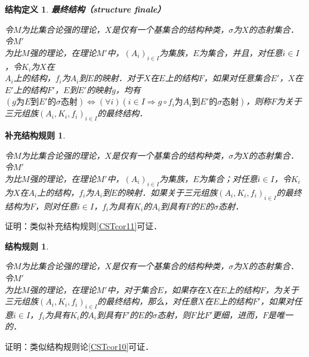 \documentclass[12pt, a4paper, oneside]{book}
\newtheorem{STdef}{结构定义}
\newtheorem{CST}{结构规则}
\newtheorem{CSTcor}{补充结构规则}
\begin{document}
			\begin{STdef}
				\textbf{最终结构（structure finale）}
				\par
				令$M$为比集合论强的理论，$X$是仅有一个基集合的结构种类，$\sigma$为$X$的态射集合．令$M'$\\为比$M$强的理论，在理论$M'$中，$(A_i)_{i\in I}$为集族，$E$为集合，并且，对任意$i\in I$，令$K_i$为$X$在\\$A_i$上的结构，$f_i$为$A_i$到$E$的映射．对于$X$在$E$上的结构$F$，如果对任意集合$E'$，$X$在$E'$上的结构$F'$，$E$到$E'$的映射$g$，均有$(g\text{为}E\text{到}E'\text{的}\sigma\text{态射})\Leftrightarrow (\forall i)(i\in I\Rightarrow g\circ f_i\text{为}A_i\text{到}E'\text{的}\sigma\text{态射})$，则称$F$为关于三元组族$(A_i, K_i, f_i)_{i\in I}$的最终结构．
			\end{STdef}
			
			\begin{CSTcor}\label{CSTcor12}
				\hfill\par
				令$M$为比集合论强的理论，$X$是仅有一个基集合的结构种类，$\sigma$为$X$的态射集合．令$M'$\\为比$M$强的理论，在理论$M'$中，$(A_i)_{i\in I}$为集族，$E$为集合；对任意$i\in I$，令$K_i$为$X$在$A_i$上的结构，$f_i$为$A_i$到$E$的映射．如果关于三元组族$(A_i, K_i, f_i)_{i\in I}$的最终结构为$F$，则对任意$i\in I$，$f_i$为具有$K_i$的$A_i$到具有$F$的$E$的$\sigma$态射．
			\end{CSTcor}
			证明：类似补充结构规则\ref{CSTcor11}可证．
			
			\begin{CST}\label{CST18}
				\hfill\par
				令$M$为比集合论强的理论，$X$是仅有一个基集合的结构种类，$\sigma$为$X$的态射集合．令$M'$\\为比$M$强的理论，在理论$M'$中，对于集合$E$，如果存在$X$在$E$上的结构$F$，为关于三元组族$(A_i, K_i, f_i)_{i\in I}$的最终结构，那么，对任意$X$在$E$上的结构$F'$，如果对任意$i\in I$，$f_i$为具有$K_i$的$A_i$到具有$F'$的$E$的$\sigma$态射，则$F$比$F'$更细，进而，$F$是唯一的．
			\end{CST}
			证明：类似结构规则论\ref{CSTcor10}可证．
			
\end{document}
